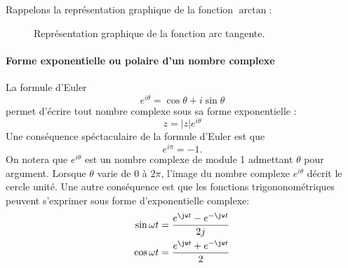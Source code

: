 Rappelons la représentation graphique de la fonction $\arctan$:

\begin{figure}[!ht]
    \centering
    \caption{Représentation graphique de la fonction arc tangente.}
\end{figure}


\paragraph{Forme exponentielle ou polaire d'un nombre complexe}
La formule d'Euler 
$$
e^{i\theta}=\cos\theta+i\sin\theta
$$
permet d'écrire tout nombre complexe sous sa forme exponentielle : 
$$
z=|z|e^{i\theta}
$$
Une conséquence spéctaculaire de la formule d'Euler est que
$$
e^{i\pi}=-1.
$$
On notera que $e^{i\theta}$ est un nombre complexe de module 1 admettant $\theta$ pour argument.
Lorsque $\theta$ varie de $0$ à $2\pi$, l'image du nombre complexe $e^{i\theta}$ décrit 
le cercle unité.
Une autre conséquence est que les fonctions trigononométriques peuvent s'exprimer sous forme d'exponentielle 
complexe:
\begin{align*}
    \sin{\omega t}&=\dfrac{e^{\jw t}-e^{-\jw t}}{2j} \\
    \cos{\omega t}&=\dfrac{e^{\jw t}+e^{-\jw t}}{2}
\end{align*}

